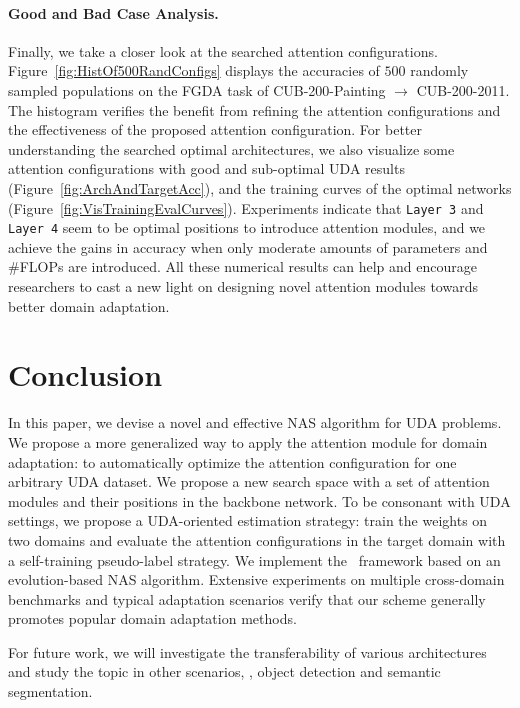 \documentclass[10pt,twocolumn,letterpaper]{article}
\begin{document}
\paragraph{Good and Bad Case Analysis.}
Finally, we take a closer look at the searched attention configurations. Figure~\ref{fig:HistOf500RandConfigs} displays the accuracies of $500$ randomly sampled populations on the FGDA task of CUB-200-Painting $\to$ CUB-200-2011.
The histogram verifies the benefit from refining the attention configurations and the effectiveness of the proposed attention configuration.
For better understanding the searched optimal architectures, we also visualize some attention configurations with good and sub-optimal UDA results (Figure~\ref{fig:ArchAndTargetAcc}), and the training curves of the optimal networks (Figure~\ref{fig:VisTrainingEvalCurves}).
Experiments indicate that \texttt{Layer 3} and \texttt{Layer 4} seem to be optimal positions to introduce attention modules, and we achieve the gains in accuracy when only moderate amounts of parameters and \#FLOPs are introduced.
All these numerical results can help and encourage researchers to cast a new light on designing novel attention modules towards better domain adaptation.














%
 
\section{Conclusion}
In this paper, we devise a novel and effective NAS algorithm for UDA problems.
We propose a more generalized way to apply the attention module for domain adaptation: to automatically optimize the attention configuration for one arbitrary UDA dataset.
We propose a new search space with a set of attention modules and their positions in the backbone network.
To be consonant with UDA settings, we propose a UDA-oriented estimation strategy: train the weights on two domains and evaluate the attention configurations in the target domain with a self-training pseudo-label strategy.
We implement the \iMethod\ framework based on an evolution-based NAS algorithm. Extensive experiments on multiple cross-domain benchmarks and typical adaptation scenarios verify that our scheme generally promotes popular domain adaptation methods.

For future work, we will investigate the transferability of various architectures and study the topic in other scenarios, \eg, object detection and semantic segmentation. 
{\small


}
\end{document}
